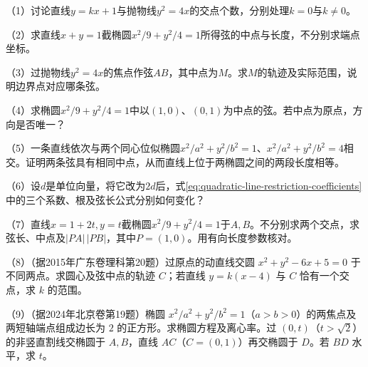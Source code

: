 \begin{exercise}
\mbox{}\par\nobreak

\begin{samepage}
（1）讨论直线\(y=kx+1\)与抛物线\(y^2=4x\)的交点个数，分别处理\(k=0\)与\(k\ne0\)。
\par
\end{samepage}

\begin{samepage}
（2）求直线\(x+y=1\)截椭圆\(x^2/9+y^2/4=1\)所得弦的中点与长度，不分别求端点坐标。
\par
\end{samepage}

\begin{samepage}
（3）过抛物线\(y^2=4x\)的焦点作弦\(AB\)，其中点为\(M\)。求\(M\)的轨迹及实际范围，说明边界点对应哪条弦。
\par
\end{samepage}

\begin{samepage}
（4）求椭圆\(x^2/9+y^2/4=1\)中以\((1,0)\)、\((0,1)\)为中点的弦。若中点为原点，方向是否唯一？
\par
\end{samepage}

\begin{samepage}
（5）一条直线依次与两个同心位似椭圆\(x^2/a^2+y^2/b^2=1\)、\(x^2/a^2+y^2/b^2=4\)相交。证明两条弦具有相同中点，从而直线上位于两椭圆之间的两段长度相等。
\par
\end{samepage}

\begin{samepage}
（6）设\(d\)是单位向量，将它改为\(2d\)后，式\eqref{eq:quadratic-line-restriction-coefficients}中的三个系数、根及弦长公式分别如何变化？
\par
\end{samepage}

\begin{samepage}
（7）直线\(x=1+2t,y=t\)截椭圆\(x^2/9+y^2/4=1\)于\(A,B\)。不分别求两个交点，求弦长、中点及\(|PA|\,|PB|\)，其中\(P=(1,0)\)。用有向长度参数核对。
\par
\end{samepage}

\begin{samepage}
（8）（据2015年广东卷理科第20题）过原点的动直线交圆 \(x^2+y^2-6x+5=0\) 于不同两点。求圆心及弦中点的轨迹 \(C\)；若直线 \(y=k(x-4)\) 与 \(C\) 恰有一个交点，求 \(k\) 的范围。
\par\end{samepage}
\begin{samepage}
（9）（据2024年北京卷第19题）椭圆 \(x^2/a^2+y^2/b^2=1\)（\(a>b>0\)）的两焦点及两短轴端点组成边长为 \(2\) 的正方形。求椭圆方程及离心率。过 \((0,t)\)（\(t>\sqrt2\)）的非竖直割线交椭圆于 \(A,B\)，直线 \(AC\)（\(C=(0,1)\)）再交椭圆于 \(D\)。若 \(BD\) 水平，求 \(t\)。
\par\end{samepage}
\end{exercise}

